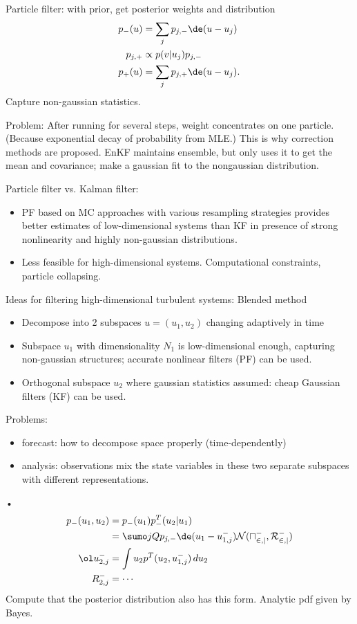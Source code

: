 Particle filter: with prior, get posterior weights and distribution
\begin{align}
p_-(u)&=\sum_j p_{j,-}\de(u-u_j)\\
p_{j,+}&\propto p(v|u_j) p_{j,-}\\
p_+(u) &=\sum_j p_{j,+}\de(u-u_j).
\end{align}
Capture non-gaussian statistics.

Problem: After running for several steps, weight concentrates on one particle. (Because exponential decay of probability from MLE.) This is why correction methods are proposed. EnKF maintains ensemble, but only uses it to get the mean and covariance; make a gaussian fit to the nongaussian distribution.

Particle filter vs. Kalman filter:
\begin{itemize}
\item
PF based on MC approaches with various resampling strategies provides better estimates of low-dimensional systems than KF in presence of strong nonlinearity and highly non-gaussian distributions.
\item
Less feasible for high-dimensional systems. %
Computational constraints, particle collapsing.
\end{itemize}
Ideas for filtering high-dimensional turbulent systems: Blended method
\begin{itemize}
\item
Decompose into 2 subspaces $u=(u_1,u_2)$ changing adaptively in time
\item
Subspace $u_1$ with dimensionality $N_1$ is low-dimensional enough, capturing non-gaussian structures; accurate nonlinear filters (PF) can be used.
\item
Orthogonal subspace $u_2$ where gaussian statistics assumed: cheap Gaussian filters (KF) can be used.
\end{itemize}
Problems:
\begin{itemize}
\item
forecast: how to decompose space properly (time-dependently)
\item
analysis: observations mix the state variables in these two separate subspaces with different representations.
\end{itemize}•
\begin{align}
p_-(u_1,u_2)&= p_-(u_1)p_-^T(u_2|u_1)\\
&=\sumo jQ p_{j,-}\de(u_1-u_{1,j}^-)\cal N(u_{2,j}^-,R_{2,j}^-)\\
\ol u_{2,j}^- &=\int u_2 p^T(u_2,u_{1,j}^-)\,du_2\\
R_{2,j}^-&=\cdots
\end{align}
Compute that the posterior distribution also has this form. Analytic pdf given by Bayes.


